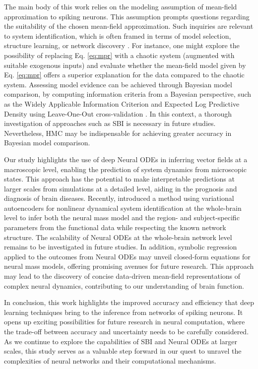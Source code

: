 \documentclass[12pt]{article}
\begin{document}
The main body of this work relies on the modeling assumption of mean-field approximation to spiking neurons. This assumption prompts questions regarding  the suitability of the chosen mean-field approximation. Such inquiries are relevant to system identification, which is often framed in terms of model selection, structure learning, or network discovery \citep{Friedman2003, Gershman2010, Seghier2013, Wipf2007}. For instance, one might explore the possibility  of replacing Eq. \eqref{eq:mpr} with a chaotic system (augmented with suitable exogenous inputs) and evaluate whether the mean-field model given by Eq. \eqref{eq:mpr} offers a superior explanation for the data compared to the chaotic system. Assessing model evidence can be achieved through Bayesian model comparison, by computing information criteria from a Bayesian perspective, such as the Widely Applicable Information Criterion \citep{Watanabe2010} and Expected Log Predictive Density using Leave-One-Out cross-validation \citep{Vehtari2016, Gelman2013}. In this context, a thorough investigation of approaches such as SBI is necessary in future studies. Nevertheless, HMC may be indispensable for achieving greater accuracy in Bayesian model comparison. 

Our study highlights the use of deep Neural ODEs in inferring vector fields at a macroscopic level, enabling the prediction of system dynamics from microscopic states. This approach has the potential to make interpretable predictions at larger scales from simulations at a detailed level, aiding in the prognosis and diagnosis of brain diseases. Recently, \cite{Sip2023} introduced a method using variational autoencoders for nonlinear dynamical system identification at the whole-brain level to infer both the neural mass model and the region- and subject-specific parameters from the functional data while respecting the known network structure. The scalability of Neural ODEs at the whole-brain network level remains to be investigated in future studies. In addition, symbolic regression applied to the outcomes from Neural ODEs may unveil closed-form equations for neural mass models, offering promising avenues for future research. This approach may lead to the discovery of concise data-driven mean-field representations of complex neural dynamics, contributing to our understanding of brain function.


In conclusion, this work highlights the improved accuracy and efficiency that deep learning techniques bring to the inference from networks of spiking neurons. It opens up exciting possibilities for future research in neural computation, where the trade-off between accuracy and uncertainty needs to be carefully considered. As we continue to explore the capabilities of SBI and Neural ODEs at larger scales, this study serves as a valuable step forward in our quest to unravel the complexities of neural networks and their computational mechanisms.
\end{document}
